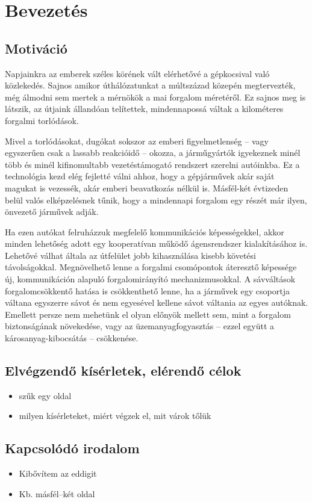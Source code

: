 \documentclass{report}
\begin{document}
	\tableofcontents
	\chapter{Bevezetés}
		\section{Motiváció}
			Napjainkra az emberek széles körének vált elérhetővé a gépkocsival való közlekedés. Sajnos amikor úthálózatunkat a múltszázad közepén megtervezték, még álmodni sem mertek a mérnökök a mai forgalom méretéről. Ez sajnos meg is látszik, az útjaink állandóan telítettek, mindennapossá váltak a kilométeres forgalmi torlódások.
			
			Mivel a torlódásokat, dugókat sokszor az emberi figyelmetlenség -- vagy egyszerűen csak a lassabb reakcióidő -- okozza, a járműgyártók igyekeznek minél több és minél kifinomultabb vezetéstámogató rendszert szerelni autóinkba. Ez a technológia kezd elég fejletté válni ahhoz, hogy a gépjárművek akár saját magukat is vezessék, akár emberi beavatkozás nélkül is. Másfél-két évtizeden belül valós elképzelésnek tűnik, hogy a mindennapi forgalom egy részét már ilyen, önvezető járművek adják.
			
			Ha ezen autókat felruházzuk megfelelő kommunikációs képességekkel, akkor minden lehetőség adott egy kooperatívan működő ágensrendszer kialakításához is. Lehetővé válhat általa az útfelület jobb kihasználása kisebb követési távolságokkal. Megnövelhető lenne a forgalmi csomópontok áteresztő képessége új, kommunikáción alapuló forgalomirányító mechanizmusokkal. A sávváltások forgalomcsökkentő hatása is csökkenthető lenne, ha a járművek egy csoportja váltana egyszerre sávot és nem egyesével kellene sávot váltania az egyes autóknak. Emellett persze nem mehetünk el olyan előnyök mellett sem, mint a forgalom biztonságának növekedése, vagy az üzemanyagfogyasztás -- ezzel együtt a károsanyag-kibocsátás -- csökkenése.
				
		\section{Elvégzendő kísérletek, elérendő célok}
			\begin{itemize}
				\item szűk egy oldal
				\item milyen kísérleteket, miért végzek el, mit várok tőlük
			\end{itemize}
		\section{Kapcsolódó irodalom}
			\begin{itemize}
				\item Kibővítem az eddigit
				\item Kb. másfél--két oldal
			\end{itemize}
		
\end{document}
